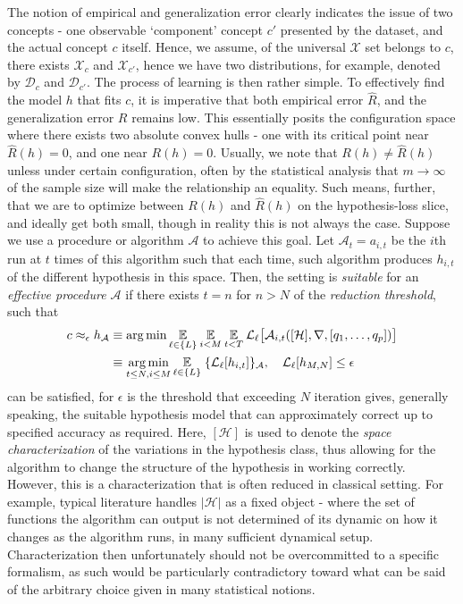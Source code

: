 The notion of empirical and generalization error clearly indicates the issue of two concepts - one observable `component' concept $c'$ presented by the dataset, and the actual concept $c$ itself. Hence, we assume, of the universal $\mathcal{X}$ set belongs to $c$, there exists $\mathcal{X}_{c}$ and $\mathcal{X}_{c'}$, hence we have two distributions, for example, denoted by $\mathcal{D}_{c}$ and $\mathcal{D}_{c'}$. The process of learning is then rather simple. To effectively find the model $h$ that fits $c$, it is imperative that both empirical error $\hat{R}$, and the generalization error $R$ remains low. This essentially posits the configuration space where there exists two absolute convex hulls - one with its critical point near $\hat{R}(h)=0$, and one near $R(h)=0$. Usually, we note that $R(h)\neq \hat{R}(h)$ unless under certain configuration, often by the statistical analysis that $m\to \infty$ of the sample size will make the relationship an equality. Such means, further, that we are to optimize between $R(h)$ and $\hat{R}(h)$ on the hypothesis-loss slice, and ideally get both small, though in reality this is not always the case. Suppose we use a procedure or algorithm $\mathcal{A}$ to achieve this goal. Let $\mathcal{A}_{t}=a_{i,t}$ be the $i$th run at $t$ times of this algorithm such that each time, such algorithm produces $h_{i,t}$ of the different hypothesis in this space. Then, the setting is \textit{suitable} for an \textit{effective procedure $\mathcal{A}$} if there exists $t=n$ for $n>N$ of the \textit{reduction threshold}, such that
\begin{equation}
     \begin{split}
        c \approx_{\epsilon} h_{\mathcal{A}} &\equiv \operatorname*{arg\,min} \underset{\ell\in\{L\}}{\mathbb{E}}\:\underset{i< M}{\mathbb{E}}\:\underset{t<T}{\mathbb{E}} \: \mathcal{L}_{\ell} \big[ \mathcal{A}_{i,t}([\mathcal{H}],\nabla,[q_{1},\dots,q_{p}])  \big] \\ 
        & \equiv \operatorname*{arg\,min}_{t\leq N, i \leq M} \underset{\ell\in\{L\}}{\mathbb{E}}\; \{ \mathcal{L}_{\ell}[h_{i,t}] \}_{\mathcal{A}} ,\quad \mathcal{L}_{\ell}[h_{M,N}]\leq \epsilon
     \end{split}
\end{equation}
can be satisfied, for $\epsilon$ is the threshold that exceeding $N$ iteration gives, generally speaking, the suitable hypothesis model that can approximately correct up to specified accuracy as required. Here, $[\mathcal{H}]$ is used to denote the \textit{space characterization} of the variations in the hypothesis class, thus allowing for the algorithm to change the structure of the hypothesis in working correctly. However, this is a characterization that is often reduced in classical setting. For example, typical literature handles $|\mathcal{H}|$ as a fixed object - where the set of functions the algorithm can output is not determined of its dynamic on how it changes as the algorithm runs, in many sufficient dynamical setup. Characterization then unfortunately should not be overcommitted to a specific formalism, as such would be particularly contradictory toward what can be said of the arbitrary choice given in many statistical notions. 


